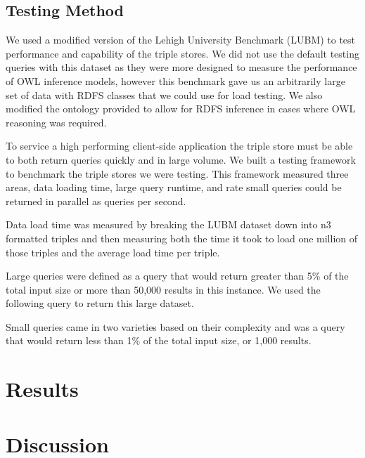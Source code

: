 \documentclass{article}
\begin{document}
\subsection{Testing Method}
We used a modified version of the Lehigh University Benchmark (LUBM) \cite{Guo2005} to test performance and capability of the triple stores.  We did not use the default testing queries with this dataset as they were more designed to measure the performance of OWL inference models, however this benchmark gave us an arbitrarily large set of data with RDFS classes that we could use for load testing.  We also modified the ontology provided to allow for RDFS inference in cases where OWL reasoning was required.

To service a high performing client-side application the triple store must be able to both return queries quickly and in large volume.  We built a testing framework to benchmark the triple stores we were testing.  This framework measured three areas, data loading time, large query runtime, and rate small queries could be returned in parallel as queries per second.

Data load time was measured by breaking the LUBM dataset down into n3 formatted triples and then measuring both the time it took to load one million of those triples and the average load time per triple.

Large queries were defined as a query that would return greater than 5\% of the total input size or more than 50,000 results in this instance.  We used the following query to return this large dataset.

Small queries came in two varieties based on their complexity and was a query that would return less than 1\% of the total input size, or 1,000 results.  

\section{Results}

\section{Discussion}



\end{document}
